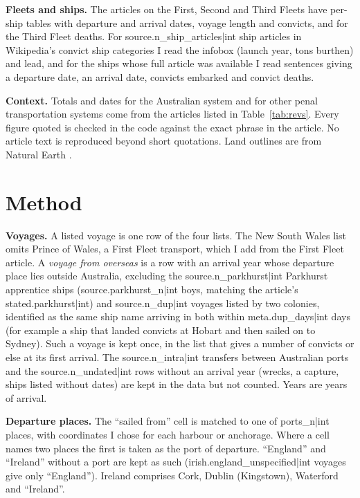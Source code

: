 \documentclass[11pt,a4paper]{article}
\begin{document}
\textbf{Fleets and ships.} The articles on the First, Second and Third Fleets have per-ship tables with departure and arrival dates, voyage length and convicts, and for the Third Fleet deaths. For {{source.n_ship_articles|int}} ship articles in Wikipedia's convict ship categories I read the infobox (launch year, tons burthen) and lead, and for the ships whose full article was available I read sentences giving a departure date, an arrival date, convicts embarked and convict deaths.

\textbf{Context.} Totals and dates for the Australian system and for other penal transportation systems come from the articles listed in Table~\ref{tab:revs}. Every figure quoted is checked in the code against the exact phrase in the article. No article text is reproduced beyond short quotations. Land outlines are from Natural Earth \citep{naturalearth}.

\section{Method}
\textbf{Voyages.} A listed voyage is one row of the four lists. The New South Wales list omits Prince of Wales, a First Fleet transport, which I add from the First Fleet article. A \emph{voyage from overseas} is a row with an arrival year whose departure place lies outside Australia, excluding the {{source.n_parkhurst|int}} Parkhurst apprentice ships ({{source.parkhurst_n|int}} boys, matching the article's {{stated.parkhurst|int}}) and {{source.n_dup|int}} voyages listed by two colonies, identified as the same ship name arriving in both within {{meta.dup_days|int}} days (for example a ship that landed convicts at Hobart and then sailed on to Sydney). Such a voyage is kept once, in the list that gives a number of convicts or else at its first arrival. The {{source.n_intra|int}} transfers between Australian ports and the {{source.n_undated|int}} rows without an arrival year (wrecks, a capture, ships listed without dates) are kept in the data but not counted. Years are years of arrival.

\textbf{Departure places.} The ``sailed from'' cell is matched to one of {{ports_n|int}} places, with coordinates I chose for each harbour or anchorage. Where a cell names two places the first is taken as the port of departure. ``England'' and ``Ireland'' without a port are kept as such ({{irish.england_unspecified|int}} voyages give only ``England''). Ireland comprises Cork, Dublin (Kingstown), Waterford and ``Ireland''.
\end{document}
